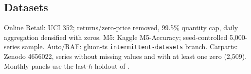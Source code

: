 \documentclass[twocolumn,10pt]{article}
\begin{document}
\subsection{Datasets}
Online Retail: UCI 352; returns/zero-price removed, 99.5\% quantity cap,
daily aggregation densified with zeros. M5: Kaggle M5-Accuracy;
seed-controlled 5{,}000-series sample. Auto/RAF: gluon-ts
\texttt{intermittent-datasets} branch. Carparts: Zenodo 4656022, series
without missing values and with at least one zero (2{,}509). Monthly
panels use the last-$h$ holdout of \citet{damato2025}.
\end{document}
